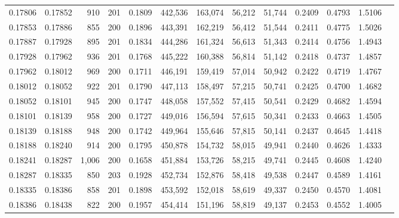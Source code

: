 \begin{tabular}{rrrrrrrrrrrrr}
0.17806 & 0.17852 &   910 & 201 &                                     0.1809 & 442,536 & 163,074 &  56,212 &  51,744 & 0.2409 & 0.4793 & 1.5106 \\
0.17853 & 0.17886 &   855 & 200 &                                     0.1896 & 443,391 & 162,219 &  56,412 &  51,544 & 0.2411 & 0.4775 & 1.5026 \\
0.17887 & 0.17928 &   895 & 201 &                                     0.1834 & 444,286 & 161,324 &  56,613 &  51,343 & 0.2414 & 0.4756 & 1.4943 \\
0.17928 & 0.17962 &   936 & 201 &                                     0.1768 & 445,222 & 160,388 &  56,814 &  51,142 & 0.2418 & 0.4737 & 1.4857 \\
0.17962 & 0.18012 &   969 & 200 &                                     0.1711 & 446,191 & 159,419 &  57,014 &  50,942 & 0.2422 & 0.4719 & 1.4767 \\
0.18012 & 0.18052 &   922 & 201 &                                     0.1790 & 447,113 & 158,497 &  57,215 &  50,741 & 0.2425 & 0.4700 & 1.4682 \\
0.18052 & 0.18101 &   945 & 200 &                                     0.1747 & 448,058 & 157,552 &  57,415 &  50,541 & 0.2429 & 0.4682 & 1.4594 \\
0.18101 & 0.18139 &   958 & 200 &                                     0.1727 & 449,016 & 156,594 &  57,615 &  50,341 & 0.2433 & 0.4663 & 1.4505 \\
0.18139 & 0.18188 &   948 & 200 &                                     0.1742 & 449,964 & 155,646 &  57,815 &  50,141 & 0.2437 & 0.4645 & 1.4418 \\
0.18188 & 0.18240 &   914 & 200 &                                     0.1795 & 450,878 & 154,732 &  58,015 &  49,941 & 0.2440 & 0.4626 & 1.4333 \\
0.18241 & 0.18287 & 1,006 & 200 &                                     0.1658 & 451,884 & 153,726 &  58,215 &  49,741 & 0.2445 & 0.4608 & 1.4240 \\
0.18287 & 0.18335 &   850 & 203 &                                     0.1928 & 452,734 & 152,876 &  58,418 &  49,538 & 0.2447 & 0.4589 & 1.4161 \\
0.18335 & 0.18386 &   858 & 201 &                                     0.1898 & 453,592 & 152,018 &  58,619 &  49,337 & 0.2450 & 0.4570 & 1.4081 \\
0.18386 & 0.18438 &   822 & 200 &                                     0.1957 & 454,414 & 151,196 &  58,819 &  49,137 & 0.2453 & 0.4552 & 1.4005 \\

\end{tabular}
